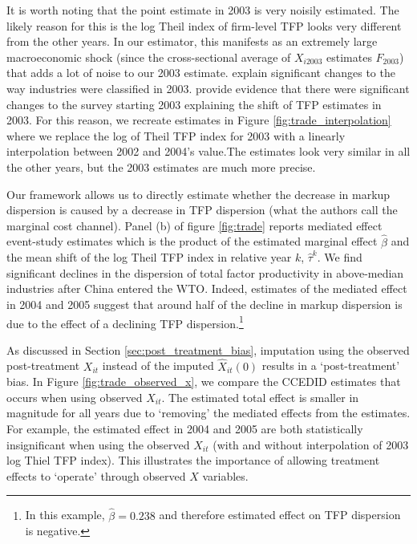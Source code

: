 \documentclass[12pt,fleqn]{article}
\begin{document}
It is worth noting that the point estimate in 2003 is very noisily estimated. The likely reason for this is the log Theil index of firm-level TFP looks very different from the other years. In our estimator, this manifests as an extremely large macroeconomic shock (since the cross-sectional average of $X_{i2003}$ estimates $F_{2003}$) that adds a lot of noise to our 2003 estimate. \citet{lu2015trade} explain significant changes to the way industries were classified in 2003. \citet{chen2019forensic} provide evidence that there were significant changes to the survey starting 2003 explaining the shift of TFP estimates in 2003. For this reason, we recreate estimates in Figure \ref{fig:trade_interpolation} where we replace the log of Theil TFP index for 2003 with a linearly interpolation between 2002 and 2004's value.The estimates look very similar in all the other years, but the 2003 estimates are much more precise.

Our framework allows us to directly estimate whether the decrease in markup dispersion is caused by a decrease in TFP dispersion (what the authors call the marginal cost channel). Panel (b) of figure \ref{fig:trade} reports mediated effect event-study estimates which is the product of the estimated marginal effect $\hat{\beta}$ and the mean shift of the log Theil TFP index in relative year $k$, $\hat{\tau}^k$. We find significant declines in the dispersion of total factor productivity in above-median industries after China entered the WTO. Indeed, estimates of the mediated effect in 2004 and 2005 suggest that around half of the decline in markup dispersion is due to the effect of a declining TFP dispersion.\footnote{In this example, $\hat{\beta} = 0.238$ and therefore estimated effect on TFP dispersion is negative.}

As discussed in Section \ref{sec:post_treatment_bias}, imputation using the observed post-treatment $X_{it}$ instead of the imputed $\hat{X}_{it}(0)$ results in a `post-treatment' bias. In Figure \ref{fig:trade_observed_x}, we compare the CCEDID estimates that occurs when using observed $X_{it}$. The estimated total effect is smaller in magnitude for all years due to `removing' the mediated effects from the estimates. For example, the estimated effect in 2004 and 2005 are both statistically insignificant when using the observed $X_{it}$ (with and without interpolation of 2003 log Thiel TFP index). This illustrates the importance of allowing treatment effects to `operate' through observed $X$ variables. 
\end{document}
